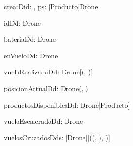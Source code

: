 \begin{problema}{crearD}{id: \ent, ps: [Producto]}{Drone}
\end{problema}

\begin{problema}{idD}{d: Drone}{\ent}
\end{problema}

\begin{problema}{bateriaD}{d: Drone}{\ent}
\end{problema}

\begin{problema}{enVueloD}{d: Drone}{\bool}
\end{problema}

\begin{problema}{vueloRealizadoD}{d: Drone}{[(\ent, \ent)]}
\end{problema}

\begin{problema}{posicionActualD}{d: Drone}{(\ent, \ent)}
\end{problema}

\begin{problema}{productosDisponiblesD}{d: Drone}{[Producto]}
\end{problema}

\begin{problema}{vueloEscaleradoD}{d: Drone}{\bool}

\end{problema}

\begin{problema}{vuelosCruzadosD}{ds: [Drone]}{[((\ent, \ent), \ent)]}
\end{problema}
